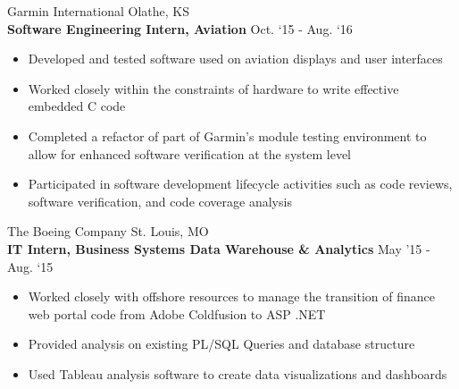 \documentclass[resmargin]{res}
\begin{document}
\begin{resume}
\begin{itemize}
\end{itemize}
Garmin International \hfill Olathe, KS\\
{\bf Software Engineering Intern, Aviation} \hfill Oct. ‘15 - Aug. ‘16
\begin{itemize}
	\item Developed and tested software used on aviation displays and user interfaces
	\item Worked closely within the constraints of hardware to write effective embedded C code
	\item Completed a refactor of part of Garmin's module testing environment to allow for enhanced software verification at the system level
	\item Participated in software development lifecycle activities such as code reviews, software verification, and code coverage analysis

\end{itemize}

\newpage

The Boeing Company \hfill St. Louis, MO\\
{\bf IT Intern, Business Systems Data Warehouse \& Analytics} \hfill May ’15 - Aug. ‘15
\begin{itemize}
	\item Worked closely with offshore resources to manage the transition of finance web portal code from Adobe Coldfusion to ASP .NET
	\item Provided analysis on existing PL/SQL Queries and database structure
	\item Used Tableau analysis software to create data visualizations and dashboards
\end{itemize}

\iffalse
Missouri S\&T IT Department \hfill Rolla, MO\\
{\bf IT Help Desk Senior Student Technician} \hfill Oct. ’14 - Present
\begin{itemize}
	\item Investigate computer related problems, determine the cause, and implement a solution or coordinate with the appropriate department to resolve the issue
	\item Serve as a point of escalation for demanding issues
	\item Oversee training of new employees and implementation of new policies
	\item Operate and manage the 3D printers available to faculty and students
	\item Repair laptops as a Dell-certified technician
\end{itemize}
\fi


\end{resume}
\end{document}
